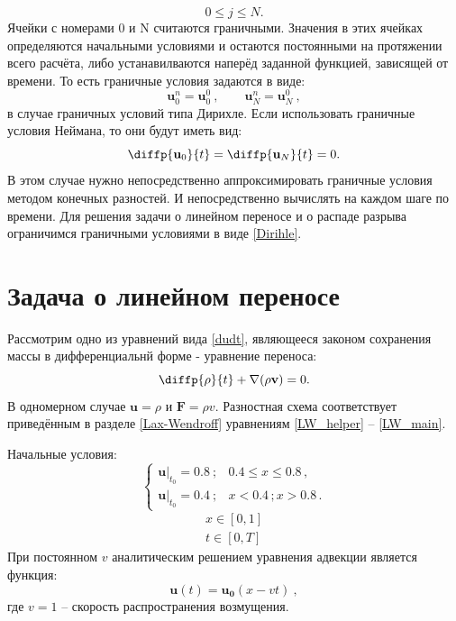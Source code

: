 \documentclass[a4paper]{article}
\begin{document}
	\[
		0 \leqslant j \leqslant N .
	\]
	Ячейки с номерами 0 и N считаются граничными. Значения в этих ячейках определяются начальными условиями и остаются постоянными на протяжении всего расчёта, либо устанавилваются наперёд заданной функцией, зависящей от времени. То есть граничные условия задаются в виде:
	\begin{equation}\label{Dirihle}
		\mathbf{u}_0^n = \mathbf{u}_0^0	\:,	\qquad	\mathbf{u}_N^n = \mathbf{u}_N^0 \:,
	\end{equation}
	в случае граничных условий типа Дирихле. Если использовать граничные условия Неймана, то они будут иметь вид:
	\begin{equation}
		\diffp{\mathbf{u}_{0}}{t} = \diffp{\mathbf{u}_{N}}{t} = 0 .
	\end{equation}
	В этом случае нужно непосредственно аппроксимировать граничные условия методом конечных разностей. И непосредственно вычислять на каждом шаге по времени. 
	Для решения задачи о линейном переносе и о распаде разрыва ограничимся граничными условиями в виде \eqref{Dirihle}.
		
	\section{Задача о линейном переносе}\label{transfer}
	Рассмотрим одно из уравнений вида \eqref{dudt}, являющееся законом сохранения массы в дифференциальнй форме - уравнение переноса:
	\begin{equation}\label{eqTransfer}
		\diffp{\rho}{t} + \nabla ( \rho \mathbf{v} ) = 0 .
	\end{equation}
	В одномерном случае $\mathbf{u} = \rho$ и $\mathbf{F} = \rho v$. Разностная схема соответствует приведённым в разделе \ref{Lax-Wendroff} уравнениям \eqref{LW_helper} -- \eqref{LW_main}.
	
	Начальные условия:
	\begin{equation}\label{initTransfer}
		\begin{cases}
			\left.\mathbf{u}\right|_{t_0} = 0.8\:;		&		0.4 \leqslant x \leqslant 0.8 \, ,	\\
			\left.\mathbf{u}\right|_{t_0} = 0.4\:;		&		x < 0.4\,; x > 0.8 \, .
		\end{cases}
	\end{equation}
	\[
		\begin{aligned}
			x \in [0, 1] \\
			t \in [0, T]
		\end{aligned}
	\]
	При постоянном $v$ аналитическим решением уравнения адвекции является функция:
	\begin{equation}
		\mathbf{u}(t) = \mathbf{u_0}(x - vt) \: ,
	\end{equation}
	где $v = 1$ -- скорость распространения возмущения. 
	
\end{document}
